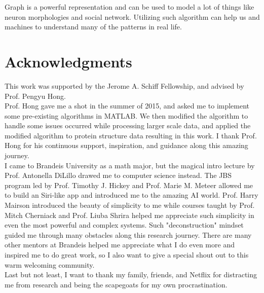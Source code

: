 Graph is a powerful representation and can be used to model a lot of things like neuron morphologies and social network. Utilizing such algorithm can help us and machines to understand many of the patterns in real life.

\chapter*{Acknowledgments}

This work was supported by the Jerome A. Schiff Fellowship, and advised by Prof. Pengyu Hong.\\

Prof. Hong gave me a shot in the summer of 2015, and asked me to implement some pre-existing algorithms in MATLAB. We then modified the algorithm to handle some issues occurred while processing larger scale data, and applied the modified algorithm to protein structure data resulting in this work. I thank Prof. Hong for his continuous support, inspiration, and guidance along this amazing journey.\\

I came to Brandeis University as a math major, but the magical intro lecture by Prof. Antonella DiLillo drawed me to computer science instead. The JBS program led by Prof. Timothy J. Hickey and Prof. Marie M. Meteer allowed me to build an Siri-like app and introduced me to the amazing AI world. Prof. Harry Mairson introduced the beauty of simplicity to me while courses taught by Prof. Mitch Cherniack and Prof. Liuba Shrira helped me appreciate such simplicity in even the most powerful and complex systems. Such "deconstruction" mindset guided me through many obstacles along this research journey. There are many other mentors at Brandeis helped me appreciate what I do even more and inspired me to do great work, so I also want to give a special shout out to this warm welcoming community.\\

Last but not least, I want to thank my family, friends, and Netflix for distracting me from research and being the scapegoats for my own procrastination.
